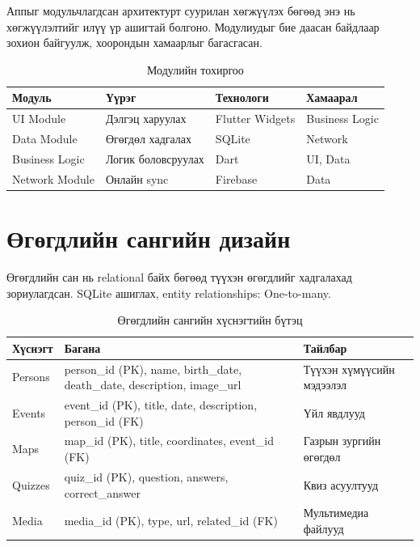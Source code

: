 Аппыг модульчлагдсан архитектурт суурилан хөгжүүлэх бөгөөд энэ нь хөгжүүлэлтийг илүү үр ашигтай болгоно. Модулиудыг бие даасан байдлаар зохион байгуулж, хоорондын хамаарлыг багасгасан.

\begin{table}[htbp]
\centering
\begin{tabular}{|p{3cm}|p{4cm}|p{3cm}|p{3cm}|}
\hline
\textbf{Модуль} & \textbf{Үүрэг} & \textbf{Технологи} & \textbf{Хамаарал} \\
\hline
UI Module & Дэлгэц харуулах & Flutter Widgets & Business Logic \\
\hline
Data Module & Өгөгдөл хадгалах & SQLite & Network \\
\hline
Business Logic & Логик боловсруулах & Dart & UI, Data \\
\hline
Network Module & Онлайн sync & Firebase & Data \\
\hline
\end{tabular}
\caption{Модулийн тохиргоо}
\label{tab:modules}
\end{table}

\section{Өгөгдлийн сангийн дизайн}

Өгөгдлийн сан нь relational байх бөгөөд түүхэн өгөгдлийг хадгалахад зориулагдсан. SQLite ашиглах, entity relationships: One-to-many.

\begin{table}[htbp]
\centering
\begin{tabular}{|p{2cm}|p{7cm}|p{4cm}|}
\hline
\textbf{Хүснэгт} & \textbf{Багана} & \textbf{Тайлбар} \\
\hline
Persons & person\_id (PK), name, birth\_date, death\_date, description, image\_url & Түүхэн хүмүүсийн мэдээлэл \\
\hline
Events & event\_id (PK), title, date, description, person\_id (FK) & Үйл явдлууд \\
\hline
Maps & map\_id (PK), title, coordinates, event\_id (FK) & Газрын зургийн өгөгдөл \\
\hline
Quizzes & quiz\_id (PK), question, answers, correct\_answer & Квиз асуултууд \\
\hline
Media & media\_id (PK), type, url, related\_id (FK) & Мультимедиа файлууд \\
\hline
\end{tabular}
\caption{Өгөгдлийн сангийн хүснэгтийн бүтэц}
\label{tab:database}
\end{table}

